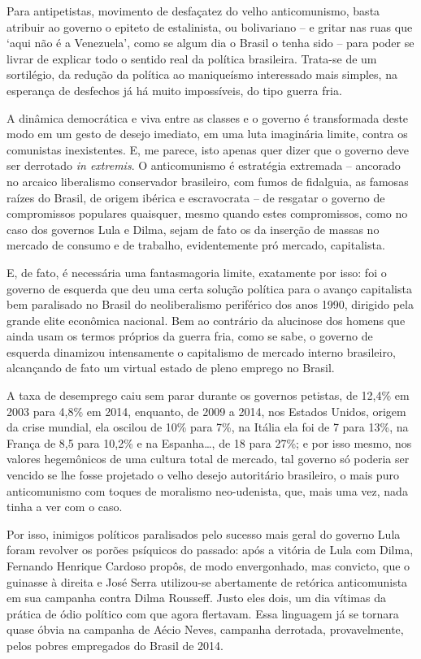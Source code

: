 Para antipetistas, movimento de desfaçatez do velho anticomunismo, basta
atribuir ao governo o epiteto de estalinista, ou bolivariano -- e gritar
nas ruas que `aqui não é a Venezuela', como se algum dia o Brasil o
tenha sido -- para poder se livrar de explicar todo o sentido real da
política brasileira. Trata-se de um sortilégio, da redução da política
ao maniqueísmo interessado mais simples, na esperança de desfechos já há
muito impossíveis, do tipo guerra fria.

A dinâmica democrática e viva entre as classes e o governo é
transformada deste modo em um gesto de desejo imediato, em uma luta
imaginária limite, contra os comunistas inexistentes. E, me parece, isto
apenas quer dizer que o governo deve ser derrotado \emph{in extremis}. O
anticomunismo é estratégia extremada -- ancorado no arcaico liberalismo
conservador brasileiro, com fumos de fidalguia, as famosas raízes do
Brasil, de origem ibérica e escravocrata -- de resgatar o governo de
compromissos populares quaisquer, mesmo quando estes compromissos, como
no caso dos governos Lula e Dilma, sejam de fato os da inserção de
massas no mercado de consumo e de trabalho, evidentemente pró mercado,
capitalista.

E, de fato, é necessária uma fantasmagoria limite, exatamente por isso:
foi o governo de esquerda que deu uma certa solução política para o
avanço capitalista bem paralisado no Brasil do neoliberalismo periférico
dos anos 1990, dirigido pela grande elite econômica nacional. Bem ao
contrário da alucinose dos homens que ainda usam os termos próprios da
guerra fria, como se sabe, o governo de esquerda dinamizou intensamente
o capitalismo de mercado interno brasileiro, alcançando de fato um
virtual estado de pleno emprego no Brasil.

A taxa de desemprego caiu sem parar durante os governos petistas, de
12,4\% em 2003 para 4,8\% em 2014, enquanto, de 2009 a 2014, nos Estados
Unidos, origem da crise mundial, ela oscilou de 10\% para 7\%, na Itália
ela foi de 7 para 13\%, na França de 8,5 para 10,2\% e na Espanha…, de
18 para 27\%; e por isso mesmo, nos valores hegemônicos de uma cultura
total de mercado, tal governo só poderia ser vencido se lhe fosse
projetado o velho desejo autoritário brasileiro, o mais puro
anticomunismo com toques de moralismo neo-udenista, que, mais uma vez,
nada tinha a ver com o caso.

Por isso, inimigos políticos paralisados pelo sucesso mais geral do
governo Lula foram revolver os porões psíquicos do passado: após a
vitória de Lula com Dilma, Fernando Henrique Cardoso propôs, de modo
envergonhado, mas convicto, que o  guinasse à direita e José Serra
utilizou-se abertamente de retórica anticomunista em sua campanha contra
Dilma Rousseff. Justo eles dois, um dia vítimas da prática de ódio
político com que agora flertavam. Essa linguagem já se tornara quase
óbvia na campanha de Aécio Neves, campanha derrotada, provavelmente,
pelos pobres empregados do Brasil de 2014.

